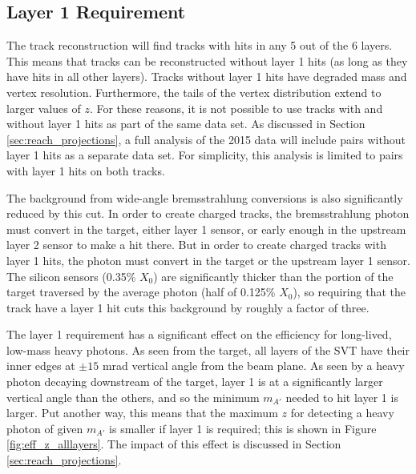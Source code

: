 \subsection{Layer 1 Requirement}
\label{sec:layer1_cut}
The track reconstruction will find tracks with hits in any 5 out of the 6 layers.
This means that tracks can be reconstructed without layer 1 hits (as long as they have hits in all other layers).
Tracks without layer 1 hits have degraded mass and vertex resolution.
Furthermore, the tails of the vertex distribution extend to larger values of $z$.
For these reasons, it is not possible to use tracks with and without layer 1 hits as part of the same data set.
As discussed in Section \ref{sec:reach_projections}, a full analysis of the 2015 data will include pairs without layer 1 hits as a separate data set.
For simplicity, this analysis is limited to pairs with layer 1 hits on both tracks.

The background from wide-angle bremsstrahlung conversions is also significantly reduced by this cut.
In order to create charged tracks, the bremsstrahlung photon must convert in the target, either layer 1 sensor, or early enough in the upstream layer 2 sensor to make a hit there.
But in order to create charged tracks with layer 1 hits, the photon must convert in the target or the upstream layer 1 sensor.
The silicon sensors (0.35\% $X_0$) are significantly thicker than the portion of the target traversed by the average photon (half of 0.125\% $X_0$), so requiring that the track have a layer 1 hit cuts this background by roughly a factor of three.

The layer 1 requirement has a significant effect on the efficiency for long-lived, low-mass heavy photons.
As seen from the target, all layers of the SVT have their inner edges at $\pm 15$ mrad vertical angle from the beam plane.
As seen by a heavy photon decaying downstream of the target, layer 1 is at a significantly larger vertical angle than the others, and so the minimum $m_{A'}$ needed to hit layer 1 is larger.
Put another way, this means that the maximum $z$ for detecting a heavy photon of given $m_{A'}$ is smaller if layer 1 is required; this is shown in Figure \ref{fig:eff_z_alllayers}.
The impact of this effect is discussed in Section \ref{sec:reach_projections}.

